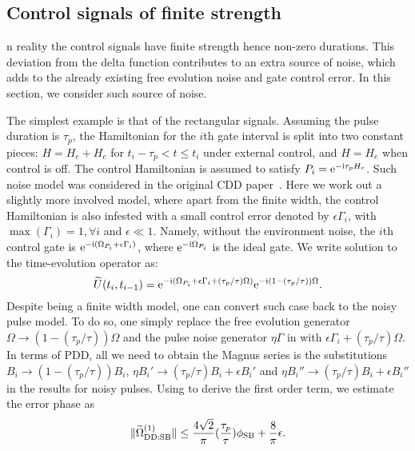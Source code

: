 \documentclass[b5paper,11pt]{article}
\newcommand{\wt}[1]{\widetilde{#1}}
\newcommand{\rDD}{\mathrm{DD}}
\begin{document}
\subsection{Control signals of finite strength}
n reality the control signals have finite strength hence non-zero durations.
This deviation from the delta function contributes to an extra source of noise, which adds to the already existing free evolution noise and gate control error. 
 In this section, we consider such source of noise. 


The simplest example is that of the rectangular signals. Assuming the pulse duration is $\tau_p$, the Hamiltonian  for the $i$th gate interval is split into two constant pieces: $H=H_e+H_c$ for $t_i -\tau_p  < t \le t_{i}$ under external control, and $H=H_e$ when control is off. The control Hamiltonian is assumed to satisfy $P_i = \mathrm{e}^{-\mathrm{i} \tau_p H_c }$.
Such noise model was considered in the original CDD paper~\!\cite{khodjasteh2007performance}. 
Here we work out a slightly more involved model, where apart from the finite width, the control Hamiltonian is also infested with a small control error denoted by $\epsilon\Gamma_i$, with $\max{(\Gamma_i)}=1, \forall i$ and $\epsilon\ll 1$.  Namely, without the environment noise, the $i$th control gate
is $ \mathrm{e}^{-\mathrm{i} (\Omega_{P_i} +\epsilon \Gamma_i)}$, where $\mathrm{e}^{-\mathrm{i} \Omega_{P_i} }$ is the ideal gate. 
We write solution to the time-evolution operator as:
\begin{equation}
 \wt U(t_{i},t_{i-1}) =  \upe^{-\upi (\Omega_{P_i} +\epsilon \Gamma_i+
 (\tau_p/\tau) \Omega)}  \upe^{-\upi (1-(\tau_p/\tau)) \Omega}.
\end{equation}
Despite being a finite width model, one can convert such case back to the noisy pulse model.
To do so, one simply replace the free evolution generator $\Omega\to (1-(\tau_p/\tau)) \Omega$ and the pulse noise generator $\eta\Gamma$  in  with $\epsilon \Gamma_i + (\tau_p/\tau) \Omega$.
In terms of PDD, all we need to obtain the Magnus series is the substitutions $B_i \to (1-(\tau_p/\tau)) B_i$, $\eta B_i' \to (\tau_p/\tau) B_i + \epsilon B_i'$ and $\eta B_i'' \to (\tau_p/\tau) B_i + \epsilon B_i''$ in the results for noisy pulses. Using  to derive the first order term, we estimate the error phase as 
\begin{equation}\label{eq:PDD-rect1}
\norm{ \wt\Omega_{\rDD:\rSB}\up{1} }\le \frac{4\sqrt{2}}{\pi} (\frac{\tau_p}{\tau})\phi_\rSB +  \frac{8}{\pi} \epsilon.
\end{equation}
\end{document}
